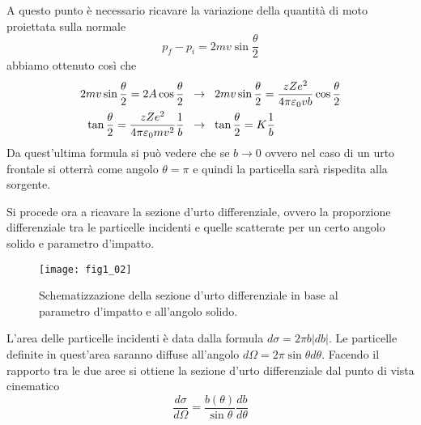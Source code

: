 A questo punto è necessario ricavare la variazione della quantità di moto proiettata sulla normale
\begin{equation}p_f-p_i=2mv\sin\frac{\theta}{2}\end{equation}
abbiamo ottenuto così che
\begin{equation}
\begin{split}
2mv\sin\frac{\theta}{2}=2A\cos\frac{\theta}{2} \hspace{0.2cm} & \to \hspace{0.2cm} 2mv\sin\frac{\theta}{2}=\frac{zZe^2}{4\pi \varepsilon_0vb}\cos\frac{\theta}{2}\\
\tan\frac{\theta}{2}=\frac{zZe^2}{4\pi\varepsilon_0mv^2}\frac{1}{b} \hspace{0.2cm} & \to\hspace{0.2cm} \tan\frac{\theta}{2}=K\frac{1}{b}
\end{split}
\end{equation}
Da quest'ultima formula si può vedere che se $b\to0$ ovvero nel caso di un urto frontale si otterrà come angolo $\theta=\pi$ e quindi la particella sarà rispedita alla sorgente.

Si procede ora a ricavare la sezione d'urto differenziale, ovvero la proporzione differenziale tra le particelle incidenti e quelle scatterate per un certo angolo solido e parametro d'impatto. 
\begin{figure}[h]
\centering
\texttt{[image: fig1\_02]}
\caption{Schematizzazione della sezione d'urto differenziale in base al parametro d'impatto e all'angolo solido.}
\label{fig:1.2}
\end{figure}
L'area delle particelle incidenti è data dalla formula $d\sigma=2\pi b |db|$. 
Le particelle definite in quest'area saranno diffuse all'angolo $d\Omega =2\pi \sin\theta d\theta$. 
Facendo il rapporto tra le due aree si ottiene la sezione d'urto differenziale dal punto di vista cinematico
\begin{equation}
\frac{d\sigma}{d\Omega}=\frac{b(\theta)}{\sin\theta}\frac{db}{d\theta}
\end{equation}

